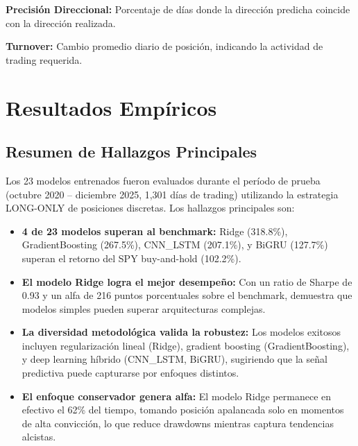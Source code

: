 \documentclass[11pt,a4paper]{article}
\begin{document}
\textbf{Precisión Direccional:} Porcentaje de días donde la dirección predicha coincide con la dirección realizada.

\textbf{Turnover:} Cambio promedio diario de posición, indicando la actividad de trading requerida.

\section{Resultados Empíricos}

\subsection{Resumen de Hallazgos Principales}

Los 23 modelos entrenados fueron evaluados durante el período de prueba (octubre 2020 -- diciembre 2025, 1,301 días de trading) utilizando la estrategia LONG-ONLY de posiciones discretas. Los hallazgos principales son:

\begin{itemize}[noitemsep]
    \item \textbf{4 de 23 modelos superan al benchmark:} Ridge (318.8\%), GradientBoosting (267.5\%), CNN\_LSTM (207.1\%), y BiGRU (127.7\%) superan el retorno del SPY buy-and-hold (102.2\%).

    \item \textbf{El modelo Ridge logra el mejor desempeño:} Con un ratio de Sharpe de 0.93 y un alfa de 216 puntos porcentuales sobre el benchmark, demuestra que modelos simples pueden superar arquitecturas complejas.

    \item \textbf{La diversidad metodológica valida la robustez:} Los modelos exitosos incluyen regularización lineal (Ridge), gradient boosting (GradientBoosting), y deep learning híbrido (CNN\_LSTM, BiGRU), sugiriendo que la señal predictiva puede capturarse por enfoques distintos.

    \item \textbf{El enfoque conservador genera alfa:} El modelo Ridge permanece en efectivo el 62\% del tiempo, tomando posición apalancada solo en momentos de alta convicción, lo que reduce drawdowns mientras captura tendencias alcistas.
\end{itemize}
\end{document}
